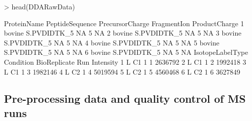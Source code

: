 \documentclass[11pt]{article}
\begin{document}
\begin{small}
\begin{Schunk}
\begin{Sinput}
> head(DDARawData)
\end{Sinput}
\begin{Soutput}
  ProteinName PeptideSequence PrecursorCharge FragmentIon ProductCharge
1      bovine     S.PVDIDTK_5              NA           5            NA
2      bovine     S.PVDIDTK_5              NA           5            NA
3      bovine     S.PVDIDTK_5              NA           5            NA
4      bovine     S.PVDIDTK_5              NA           5            NA
5      bovine     S.PVDIDTK_5              NA           5            NA
6      bovine     S.PVDIDTK_5              NA           5            NA
  IsotopeLabelType Condition BioReplicate Run Intensity
1                L        C1            1   1   2636792
2                L        C1            1   2   1992418
3                L        C1            1   3   1982146
4                L        C2            1   4   5019594
5                L        C2            1   5   4560468
6                L        C2            1   6   3627849
\end{Soutput}
\end{Schunk}
\end{small}


\subsection{Pre-processing data and quality control of MS runs \label{sec:DDAprocess}}
\end{document}
